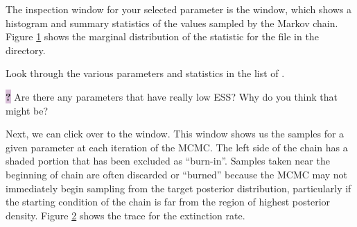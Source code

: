 The inspection window for your selected parameter is the  window, which shows a histogram and summary statistics of the values sampled by the Markov chain. 
Figure \ref{fig:tracer-post-ests} shows the marginal distribution of the  statistic for the  file in the  directory.
\begin{figure}[h!]
\label{fig:tracer-post-ests}
\end{figure}


\begin{framed}
Look through the various parameters and statistics in the list of . 

\colorbox{Thistle}{\bf ?} Are there any parameters that have really low ESS? Why do you think that might be?
\end{framed}

Next, we can click over to the  window.
This window shows us the samples for a given parameter at each iteration of the MCMC.
The left side of the chain has a shaded portion that has been excluded as ``burn-in''.
Samples taken near the beginning of chain are often discarded or ``burned'' because the MCMC may not immediately begin sampling from the target posterior distribution, particularly if the starting condition of the chain is far from the region of highest posterior density.
Figure \ref{fig:tracer-extinction-trace} shows the trace for the extinction rate.

\begin{figure}[h!]
\label{fig:tracer-extinction-trace}
\end{figure}

